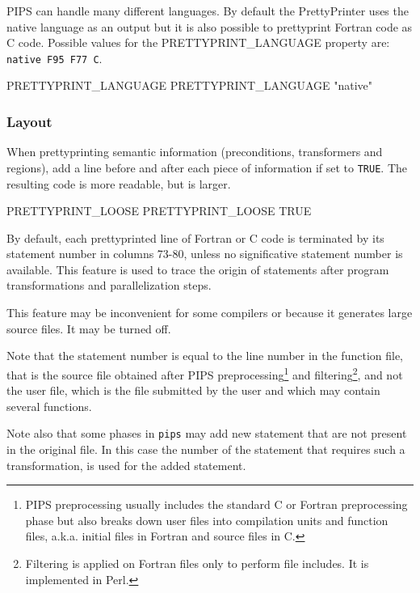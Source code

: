\documentclass[a4paper]{report}
\begin{document}
PIPS can handle many different languages. By default the PrettyPrinter uses
the native language as an output but it is also possible to prettyprint
Fortran code as C code. Possible values for the PRETTYPRINT\_LANGUAGE property
are: \texttt{native F95 F77 C}.

\begin{PipsProp}{PRETTYPRINT_LANGUAGE}
PRETTYPRINT_LANGUAGE "native"
\end{PipsProp}

\subsubsection{Layout}

When prettyprinting semantic information (preconditions, transformers and
regions), add a line before and after each piece of information if set to
\verb+TRUE+. The resulting code is more readable, but is larger.

\begin{PipsProp}{PRETTYPRINT_LOOSE}
PRETTYPRINT_LOOSE TRUE
\end{PipsProp}

By default, each prettyprinted line of Fortran or C code is terminated by its
statement number in columns 73-80, unless no significative statement
number is available. This feature is used to trace the origin of
statements after program transformations and parallelization steps.

This feature may be inconvenient for some compilers or because it
generates large source files. It may be turned off.

Note that the statement number is equal to the line number in the
function file, that is the source file obtained after PIPS
preprocessing\footnote{PIPS preprocessing usually includes the
standard C or Fortran preprocessing phase but also breaks down user
files into compilation units and function files, a.k.a. initial files
in Fortran and source files in C.} and filtering\footnote{Filtering is
applied on Fortran files only to perform file includes. It is
implemented in Perl.}, and not the user file, which is the file
submitted by the user and which may contain several functions.

Note also that some phases in \texttt{pips} may add new statement
that are not present in the original file. In this case the number of
the statement that requires such a transformation, is used for the
added statement.
\end{document}
